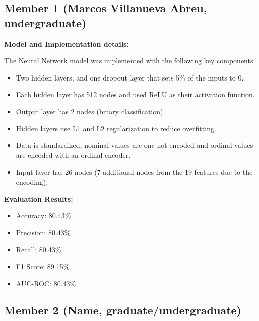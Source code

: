 \documentclass[11pt,a4paper]{article}
\begin{document}
\subsection{Member 1 (Marcos Villanueva Abreu, undergraduate)}

\begin{tcolorbox}[
        title=Neural Network Implementation,
        colback=lightblue!30,
        colframe=darkblue,
        boxrule=0.5pt,
        fonttitle=\bfseries\sffamily\footnotesize,
        fontupper=\footnotesize
    ]
    \textbf{Model and Implementation details:}

    The Neural Network model was implemented with the following key components:
    \begin{itemize}[leftmargin=*, itemsep=2pt, parsep=0pt]
        \item Two hidden layers, and one dropout layer that sets 5\% of the inputs to 0.
        \item Each hidden layer has 512 nodes and used ReLU as their activation function.
        \item Output layer has 2 nodes (binary classification).
        \item Hidden layers use L1 and L2 regularization to reduce overfitting.
        \item Data is standardized, nominal values are one hot encoded and ordinal values are encoded with an ordinal encoder.
        \item Input layer has 26 nodes (7 additional nodes from the 19 features due to the encoding).
    \end{itemize}

    \textbf{Evaluation Results:}
    \begin{itemize}[leftmargin=*, itemsep=2pt, parsep=0pt]
        \item Accuracy: 80.43\%
        \item Precision: 80.43\%
        \item Recall: 80.43\%
        \item F1 Score: 89.15\%
        \item AUC-ROC: 80.43\%
    \end{itemize}
\end{tcolorbox}

\subsection{Member 2 (Name, graduate/undergraduate)}
\end{document}
